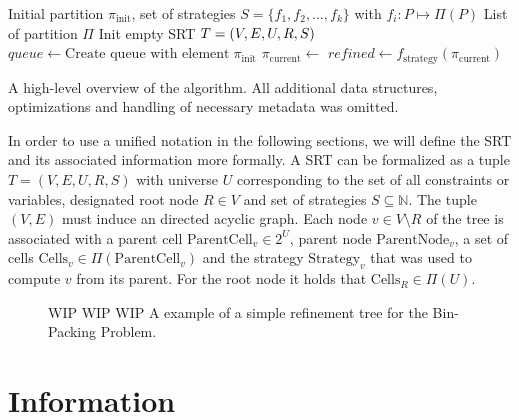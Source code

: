 		\begin{algorithm}
			\centering
			\begin{algorithmic}
				\Require Initial partition $\pi_{\mathrm{init}}$, set of strategies $S = \{ f_1, f_2, \ldots, f_k \}$ with $f_i: P \mapsto \Pi(P)$
				\Ensure List of partition $\Pi$
				\Statex
					\State Init empty \ac{SRT} $T = (V, E, U, R, S)$
					\State $queue \gets \text{Create queue with element} \; \pi_{\mathrm{init}}$
						\State $\pi_{\mathrm{current}} \gets$ 
								\State $refined \gets f_{\mathrm{strategy}}(\pi_{\mathrm{current}})$ 
								\State {}
							\EndFor
						\EndFor
					\EndWhile
					
				\EndFunction
			\end{algorithmic}
			\caption{A high-level overview of the algorithm. All additional data structures, optimizations and handling of necessary metadata was omitted.}
			\label{fig:tree:algo}
		\end{algorithm}
		
		In order to use a unified notation in the following sections, we will define the \ac{SRT} and its associated information more formally.
		A \ac{SRT} can be formalized as a tuple $T = (V, E, U, R, S)$ with universe $U$ corresponding to the set of all constraints or variables, designated root node $R \in V$ and set of strategies $S \subseteq \mathbb{N}$.
		The tuple $(V, E)$ must induce an directed acyclic graph.
		Each node $v \in V \setminus R$ of the tree is associated with a parent cell $\mathrm{ParentCell}_v \in 2^U$, parent node $\mathrm{ParentNode}_v$, a set of cells $\mathrm{Cells}_{v} \in \Pi(\mathrm{ParentCell}_v)$ and the strategy $\mathrm{Strategy}_v$ that was used to compute $v$ from its parent.
		For the root node it holds that $\mathrm{Cells}_R \in \Pi(U)$.
		
		\begin{figure}[ht!]
			\centering
			
			\caption{WIP WIP WIP A example of a simple refinement tree for the Bin-Packing Problem.}
			\label{fig:tree:motivation}
		\end{figure}
	
		\clearpage

	\section{Information}
	
